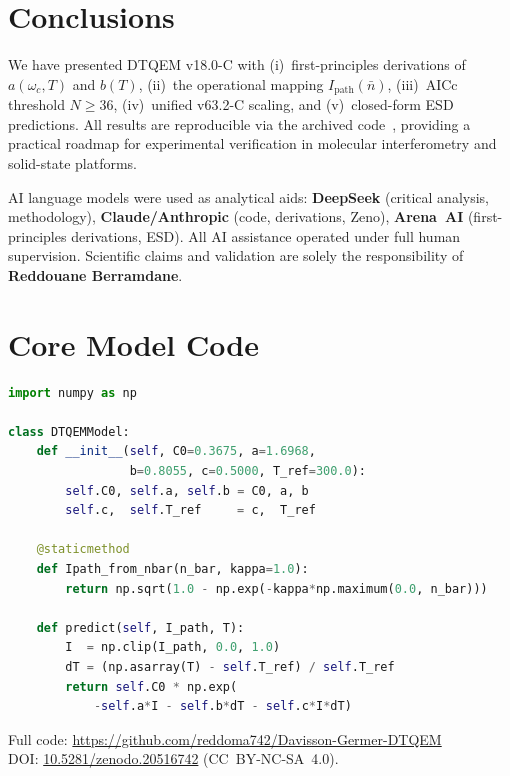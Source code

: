 \documentclass[reprint,amsmath,amssymb,aps,pra,superscriptaddress]{revtex4-2}
\begin{document}
\section{Conclusions}
We have presented DTQEM v18.0-C with (i)~first-principles derivations of
$a(\omega_c,T)$ and $b(T)$, (ii)~the operational mapping
$I_{\text{path}}(\bar n)$, (iii)~AICc threshold $N\ge36$,
(iv)~unified v63.2-C scaling, and (v)~closed-form ESD predictions.
All results are reproducible via the archived code~\cite{zenodo_dtqem},
providing a practical roadmap for experimental verification in
molecular interferometry and solid-state platforms.

\begin{acknowledgments}
AI language models were used as analytical aids:
\textbf{DeepSeek} (critical analysis, methodology),
\textbf{Claude/Anthropic} (code, derivations, Zeno),
\textbf{Arena~AI} (first-principles derivations, ESD).
All AI assistance operated under full human supervision.
Scientific claims and validation are solely the responsibility of
\textbf{Reddouane Berramdane}.
\end{acknowledgments}

\appendix
\section{Core Model Code}
\label{app:code}
\begin{lstlisting}[language=Python]
import numpy as np

class DTQEMModel:
    def __init__(self, C0=0.3675, a=1.6968,
                 b=0.8055, c=0.5000, T_ref=300.0):
        self.C0, self.a, self.b = C0, a, b
        self.c,  self.T_ref     = c,  T_ref

    @staticmethod
    def Ipath_from_nbar(n_bar, kappa=1.0):
        return np.sqrt(1.0 - np.exp(-kappa*np.maximum(0.0, n_bar)))

    def predict(self, I_path, T):
        I  = np.clip(I_path, 0.0, 1.0)
        dT = (np.asarray(T) - self.T_ref) / self.T_ref
        return self.C0 * np.exp(
            -self.a*I - self.b*dT - self.c*I*dT)
\end{lstlisting}
Full code: \url{https://github.com/reddoma742/Davisson-Germer-DTQEM} \\
DOI: \href{https://doi.org/10.5281/zenodo.20516742}{10.5281/zenodo.20516742}
(CC~BY-NC-SA~4.0).
\end{document}
